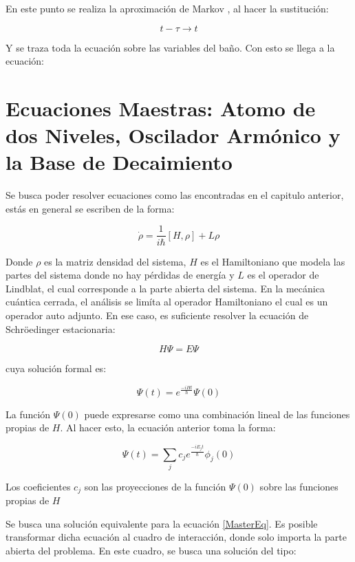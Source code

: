 \documentclass[a4paper,10pt]{report}
\begin{document}
En este punto se realiza la aproximación de Markov \cite{ZollerQN}, al hacer la sustitución:

\begin{equation}
t-\tau \rightarrow t
\end{equation}

Y se traza toda la ecuación sobre las variables del baño. Con esto se llega a la ecuación:


\chapter{Ecuaciones Maestras: Atomo de dos Niveles, Oscilador Armónico y la Base de Decaimiento}

Se busca poder resolver ecuaciones como las encontradas en el capitulo anterior, estás en general se escriben de la forma:

\begin{equation}\label{MasterEq}
\dot{\rho} = \frac{1}{i\hbar}[H,\rho] + L\rho
\end{equation}

Donde $\rho$ es la matriz densidad del sistema, $H$ es el Hamiltoniano que modela las partes del sistema donde no hay pérdidas de energía y $L$ es el operador de Lindblat, el cual corresponde a la parte abierta del sistema. En la mecánica cuántica cerrada, el análisis se limíta al operador Hamiltoniano el cual es un operador auto adjunto. En ese caso, es suficiente resolver la ecuación de Schröedinger estacionaria:

\begin{equation}
H\Psi = E\Psi
\end{equation}

cuya solución formal es:

\begin{equation}
\Psi(t) = e^{\frac{-iHt}{\hbar}}\Psi(0)
\end{equation}

La función $\Psi(0)$ puede expresarse como una  combinación lineal de las funciones propias de $H$. Al hacer esto, la ecuación anterior toma la forma:

\begin{equation}
\Psi(t) = \sum_j c_j e^{\frac{-iE_jt}{\hbar}}\phi_j(0)
\end{equation}

Los coeficientes $c_j$ son las proyecciones de la función $\Psi(0)$ sobre las funciones propias de $H$

Se busca una solución equivalente para la ecuación \eqref{MasterEq}. Es posible transformar dicha ecuación al cuadro de interacción, donde solo importa la parte abierta del problema. En este cuadro, se busca una solución del tipo:
\end{document}
